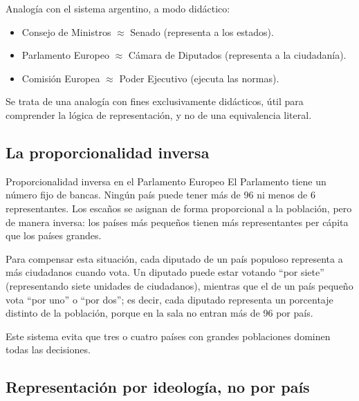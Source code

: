 \documentclass[12pt,oneside]{book}
\begin{document}
\begin{note}
Analogía con el sistema argentino, a modo didáctico:
\begin{itemize}
    \item Consejo de Ministros $\approx$ Senado (representa a los estados).
    \item Parlamento Europeo $\approx$ Cámara de Diputados (representa a la ciudadanía).
    \item Comisión Europea $\approx$ Poder Ejecutivo (ejecuta las normas).
\end{itemize}
Se trata de una analogía con fines exclusivamente didácticos, útil para comprender la lógica de representación, y no de una equivalencia literal.
\end{note}

\subsection{La proporcionalidad inversa}

\begin{definition}{Proporcionalidad inversa en el Parlamento Europeo}
El Parlamento tiene un número fijo de bancas. Ningún país puede tener más de 96 ni menos de 6 representantes. Los escaños se asignan de forma proporcional a la población, pero de manera inversa: los países más pequeños tienen más representantes per cápita que los países grandes.
\end{definition}

Para compensar esta situación, cada diputado de un país populoso representa a más ciudadanos cuando vota. Un diputado puede estar votando ``por siete'' (representando siete unidades de ciudadanos), mientras que el de un país pequeño vota ``por uno'' o ``por dos''; es decir, cada diputado representa un porcentaje distinto de la población, porque en la sala no entran más de 96 por país.

Este sistema evita que tres o cuatro países con grandes poblaciones dominen todas las decisiones.

\subsection{Representación por ideología, no por país}
\end{document}
